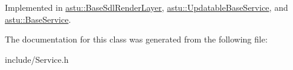 Implemented in \hyperlink{classastu_1_1BaseSdlRenderLayer_a0f4fbd9bbd5613589a8f1ce39d8b6340}{astu\+::\+Base\+Sdl\+Render\+Layer}, \hyperlink{classastu_1_1UpdatableBaseService_a47e3725f717cee3cd8983f485b2a0243}{astu\+::\+Updatable\+Base\+Service}, and \hyperlink{classastu_1_1BaseService_a59dade033dcb44dd32155c526a3a58e2}{astu\+::\+Base\+Service}.



The documentation for this class was generated from the following file\+:\begin{DoxyCompactItemize}
\item 
include/Service.\+h\end{DoxyCompactItemize}
